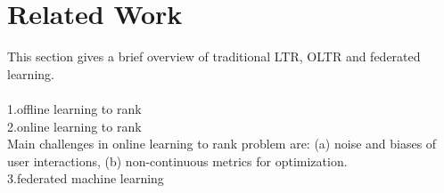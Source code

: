 \section{Related Work}

This section gives a brief overview of traditional LTR, OLTR and federated learning. \\
\\
1.offline learning to rank\\
2.online learning to rank\\
Main challenges in online learning to rank problem are: (a) noise and biases of user interactions, (b) non-continuous metrics for optimization.\\
3.federated machine learning\\



